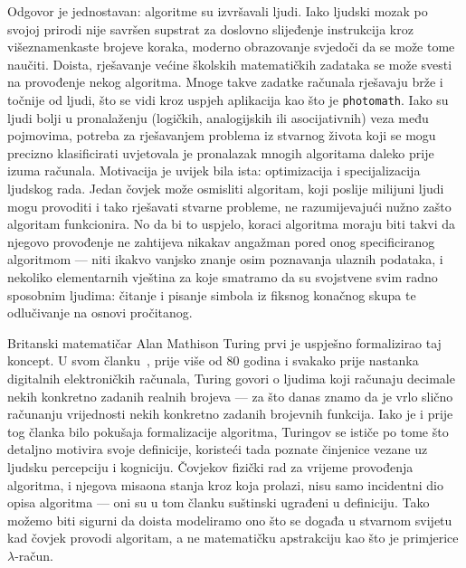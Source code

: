 Odgovor je jednostavan: algoritme su izvršavali ljudi. Iako ljudski mozak po svojoj prirodi nije savršen supstrat za doslovno slijeđenje instrukcija kroz višeznamenkaste brojeve koraka, moderno obrazovanje svjedoči da se može tome na\-u\-či\-ti. Doista, rješavanje većine školskih matematičkih zadataka se može svesti na provođenje nekog algoritma. Mnoge takve zadatke računala rješavaju brže i točnije od ljudi, što se vidi kroz uspjeh aplikacija kao što je \texttt{photomath}. Iako su ljudi bolji u pronalaženju (logičkih, analogijskih ili asocijativnih) veza među pojmovima, potreba za rješavanjem problema iz stvarnog života koji se mogu precizno klasificirati uvjetovala je pronalazak mnogih algoritama daleko prije izuma računala. Motivacija je uvijek bila ista: optimizacija i specijalizacija ljudskog rada. Jedan čovjek može osmisliti algoritam, koji poslije milijuni ljudi mogu provoditi i tako rješavati stvarne probleme, ne razumijevajući nužno zašto algoritam funkcionira. No da bi to uspjelo, koraci algoritma moraju biti takvi da njegovo provođenje ne zahtijeva nikakav angažman pored onog specificiranog algoritmom --- niti ikakvo vanjsko znanje osim poznavanja ulaznih podataka, i nekoliko elementarnih vještina za koje smatramo da su svojstvene svim radno sposobnim ljudima: čitanje i pisanje simbola iz fiksnog konačnog skupa te odlučivanje na osnovi pročitanog.

Britanski matematičar Alan Mathison Turing prvi je uspješno formalizirao taj koncept. U svom članku~\cite{turing}, prije više od 80 godina i svakako prije nastanka digitalnih elektroničkih računala, Turing govori o ljudima koji računaju decimale nekih konkretno zadanih realnih brojeva --- za što danas znamo da je vrlo slično računanju vrijednosti nekih konkretno zadanih brojevnih funkcija. Iako je i prije tog članka bilo pokušaja formalizacije algoritma, Turingov se ističe po tome što detaljno motivira svoje definicije, koristeći tada poznate činjenice vezane uz ljudsku percepciju i kogniciju. Čovjekov fizički rad za vrijeme provođenja algoritma, i njegova misaona stanja kroz koja prolazi, nisu samo incidentni dio opisa algoritma --- oni su u tom članku suštinski ugrađeni u definiciju. Tako možemo biti sigurni da doista modeliramo ono što se događa u stvarnom svijetu kad čovjek provodi algoritam, a ne matematičku apstrakciju kao što je primjerice $\lambda$-račun.


